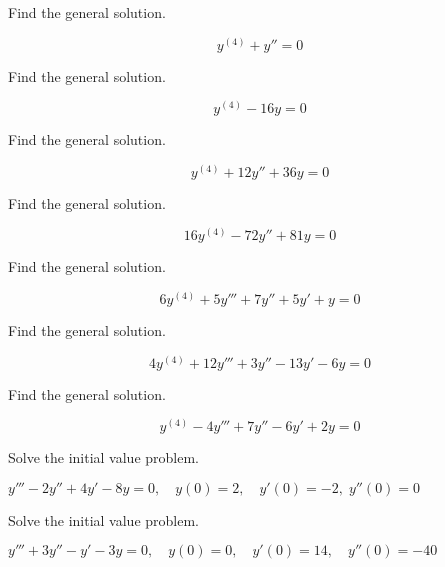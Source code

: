 \documentclass{ximera}
\begin{document}
\begin{problem}\label{exer:9.2.8} Find the general solution.

$$y^{(4)}+y''=0$$

\end{problem}

 \begin{problem}\label{exer:9.2.9}  Find the general solution.

$$y^{(4)}-16y=0$$

\end{problem}


\begin{problem}\label{exer:9.2.10} Find the general solution.

$$y^{(4)}+12y''+36y=0$$
\end{problem}



\begin{problem}\label{exer:9.2.11} Find the general solution.

$$16y^{(4)}-72y''+81y=0$$

\end{problem}

\begin{problem}\label{exer:9.2.12} Find the general solution.

$$6y^{(4)}+5y'''+7y''+5y'+y=0$$

\end{problem}


\begin{problem}\label{exer:9.2.13}  Find the general solution.

$$4y^{(4)}+12y'''+3y''-13y'-6y=0$$
\end{problem}


\begin{problem}\label{exer:9.2.14}  Find the general solution.

$$y^{(4)}-4y'''+7y''-6y'+2y=0$$

\end{problem}


\begin{problem}\label{exer:9.2.15}
Solve the
initial value problem.

$y'''-2y''+4y'-8y=0, \quad  y(0)=2,\quad y'(0)=-2,\;  y''(0)=0$
\end{problem}

\begin{problem}\label{exer:9.2.16}  Solve the
initial value problem.

$y'''+3y''-y'-3y=0, \quad  y(0)=0,\quad y'(0)=14,\quad y''(0)=-40$
\end{problem}
\end{document}
